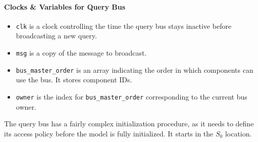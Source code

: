 \paragraph{Clocks \& Variables for Query Bus}
\begin{itemize}
\item
   \lstinline!clk! is a clock controlling the time the query bus stays inactive
   before broadcasting a new query.
\item \lstinline!msg! is a copy of the message to broadcast.
\item
   \lstinline!bus_master_order! is an array indicating the order in which
   components can use the bus. It stores component IDs.
\item
   \lstinline!owner! is the index for \lstinline!bus_master_order!
   corresponding to the current bus owner.
\end{itemize}

The query bus has a fairly complex initialization procedure, as it needs to
define its access policy before the model is fully initialized. It starts in
the $S_0$ location.

